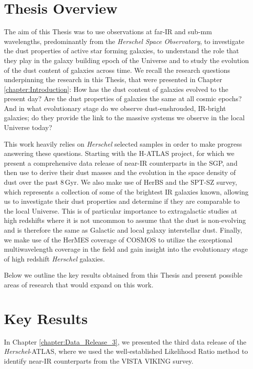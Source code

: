 \sloppy

\section{Thesis Overview}

The aim of this Thesis was to use observations at far-IR and sub-mm wavelengths, predominantly from the \textit{Herschel Space Observatory}, to investigate the dust properties of active star forming galaxies, to understand the role that they play in the galaxy building epoch of the Universe and to study the evolution of the dust content of galaxies across time. We recall the research questions underpinning the research in this Thesis, that were presented in Chapter \ref{chapter:Introduction}: How has the dust content of galaxies evolved to the present day? Are the dust properties of galaxies the same at all cosmic epochs? And in what evolutionary stage do we observe dust-enshrouded, IR-bright galaxies; do they provide the link to the massive systems we observe in the local Universe today? 

This work heavily relies on \textit{Herschel} selected samples in order to make progress answering these questions. Starting with the H-ATLAS project, for which we present a comprehensive data release of near-IR counterparts in the SGP, and then use to derive their dust masses and the evolution in the space density of dust over the past $8\,$Gyr. We also make use of HerBS and the SPT-SZ survey, which represents a collection of some of the brightest IR galaxies known, allowing us to investigate their dust properties and determine if they are comparable to the local Universe. This is of particular importance to extragalactic studies at high redshifts where it is not uncommon to assume that the dust is non-evolving and is therefore the same as Galactic and local galaxy interstellar dust. Finally, we make use of the HerMES coverage of COSMOS to utilize the exceptional multiwavelength coverage in the field and gain insight into the evolutionary stage of high redshift \textit{Herschel} galaxies.

Below we outline the key results obtained from this Thesis and present possible areas of research that would expand on this work.

\section{Key Results}

In Chapter \ref{chapter:Data_Release_3}, we presented the third data release of the \textit{Herschel}-ATLAS, where we used the well-established Likelihood Ratio method to identify near-IR counterparts from the VISTA VIKING survey.

